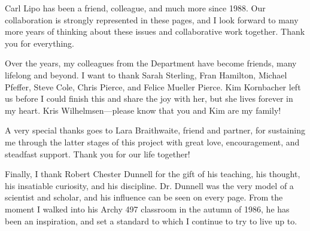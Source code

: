 \vskip 0.3cm

Carl Lipo has been a friend, colleague, and much more since 1988.  Our collaboration is strongly represented in these pages, and I look forward to many more years of thinking about these issues and collaborative work together.  Thank you for everything.

\vskip 0.3cm

Over the years, my colleagues from the Department have become friends, many lifelong and beyond.  I want to thank Sarah Sterling, Fran Hamilton, Michael Pfeffer, Steve Cole,  Chris Pierce, and Felice Mueller Pierce.  Kim Kornbacher left us before I could finish this and share the joy with her, but she lives forever in my heart.  Kris Wilhelmsen---please know that you and Kim are my family!

\vskip 0.3cm

A very special thanks goes to Lara Braithwaite, friend and partner, for sustaining me through the latter stages of this project with great love, encouragement, and steadfast support.  Thank you for our life together! 
\vskip 0.3cm

Finally, I thank Robert Chester Dunnell for the gift of his teaching, his thought, his insatiable curiosity, and his discipline.  Dr. Dunnell was the very model of a scientist and scholar, and his influence can be seen on every page.  From the moment I walked into his Archy 497 classroom in the autumn of 1986, he has been an inspiration, and set a standard to which I continue to try to live up to.  








% 



\newpage
%